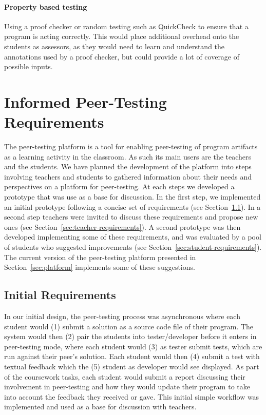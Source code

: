 \documentclass[sigplan,10pt,review]{acmart}\settopmatter{printfolios=true}
\begin{document}
\paragraph{Property based testing} Using a proof checker or random testing
  such as QuickCheck to ensure that a program is acting correctly. This
  would place additional overhead onto the students as assessors, as
  they would need to learn and understand the annotations used by a
  proof checker, but could provide a lot of coverage of possible
  inputs.



\section{Informed Peer-Testing Requirements}
\label{sec:requirements}

The peer-testing platform is a tool for enabling peer-testing of
program artifacts as a learning activity in the classroom. As such its
main users are the teachers and the students. We have planned the
development of the platform into steps involving teachers and students
to gathered information about their needs and perspectives on a
platform for peer-testing. At each steps we developed a prototype that
was use as a base for discussion. In the first step, we implemented an
initial prototype following a concise set of requirements (see
Section~\ref{sec:initial-requirements}). In a second step teachers
were invited to discuss these requirements and propose new ones (see
Section~\ref{sec:teacher-requirements}). A second prototype was then
developed implementing some of these requirements, and was evaluated
by a pool of students who suggested improvements (see
Section~\ref{sec:student-requirements}). The current version of the
peer-testing platform presented in Section~\ref{sec:platform}
implements some of these suggestions.

\subsection{Initial Requirements}
\label{sec:initial-requirements}

In our initial design, the peer-testing process was asynchronous where
each student would (1) submit a solution as a source code file of
their program. The system would then (2) pair the students into
tester/developer before it enters in peer-testing mode, where each
student would (3) as tester submit tests, which are run against their
peer's solution. Each student would then (4) submit a test with
textual feedback which the (5) student as developer would see
displayed. As part of the coursework tasks, each student would submit
a report discussing their involvement in peer-testing and how they
would update their program to take into account the feedback they
received or gave. This initial simple workflow was implemented and
used as a base for discussion with teachers.
\end{document}
